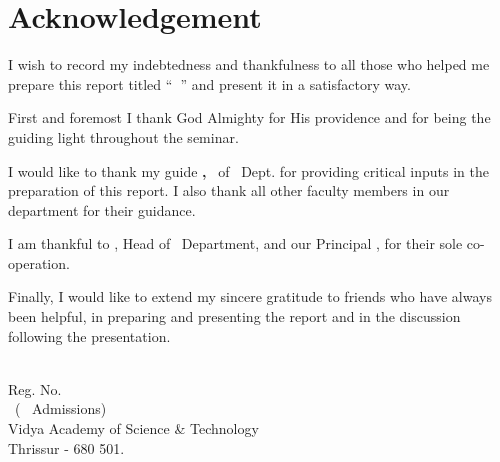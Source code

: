 
\chapter*{Acknowledgement}
%


\par
\hspace{0.9cm}I wish to record my indebtedness and thankfulness 
to all those who helped me prepare this report titled ``{\bf \vtitle\ }''  and present it in a satisfactory way.

\vspace {.2cm}
\par
\hspace{.35cm}First and foremost I thank God Almighty for His providence and for being the guiding light throughout the seminar.

\vspace{0.2cm}
\par
\hspace{0.35cm}I would like to thank my guide {\bf \vguide, } \vguidedg\ of \vdept\  Dept. for providing critical inputs in the preparation of this report. I also thank all other faculty members in our department for their guidance.


\vspace{.2cm}
\par 
\hspace{.35cm}I am thankful to {\bf \vhod}, 
Head of \vdept\  Department, and our Principal {\bf \vprincipal}, for their sole co-operation.



\vspace{0.2cm}
\par
\hspace{0.35cm}Finally, I would like to extend my sincere gratitude to friends who have always been helpful, in preparing and presenting the report and in the discussion following the presentation.

\begin{flushright}
\vauthor\\
Reg. No. \vregisternumber\\
\vclass\  ( \vadmissionyear\  Admissions)\\
Vidya Academy of Science \& Technology\\
Thrissur - 680 501.
\end{flushright}

\vmonth\ 

